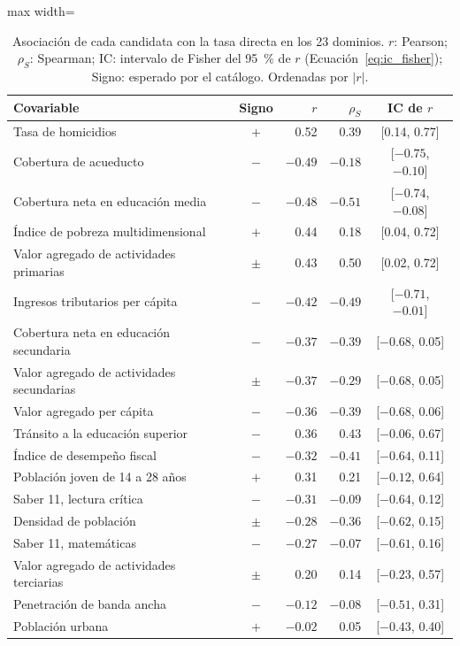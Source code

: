 \begin{table}[!htbp]
\centering
\small
\caption{Asociación de cada candidata con la tasa directa en los 23 dominios. $r$: Pearson; $\rho_S$: Spearman; IC: intervalo de Fisher del 95~\% de $r$ (Ecuación~\ref{eq:ic_fisher}); Signo: esperado por el catálogo. Ordenadas por $|r|$.}
\label{tab:res_bivariado}
\begin{adjustbox}{max width=\linewidth}
\begin{tabular}{l c r r c}
\toprule
Covariable & Signo & $r$ & $\rho_S$ & IC de $r$ \\
\midrule
Tasa de homicidios & $+$ & 0.52 & 0.39 & [0.14, 0.77] \\
Cobertura de acueducto & $-$ & $-0.49$ & $-0.18$ & [$-0.75$, $-0.10$] \\
Cobertura neta en educación media & $-$ & $-0.48$ & $-0.51$ & [$-0.74$, $-0.08$] \\
Índice de pobreza multidimensional & $+$ & 0.44 & 0.18 & [0.04, 0.72] \\
Valor agregado de actividades primarias & $\pm$ & 0.43 & 0.50 & [0.02, 0.72] \\
Ingresos tributarios per cápita & $-$ & $-0.42$ & $-0.49$ & [$-0.71$, $-0.01$] \\
Cobertura neta en educación secundaria & $-$ & $-0.37$ & $-0.39$ & [$-0.68$, 0.05] \\
Valor agregado de actividades secundarias & $\pm$ & $-0.37$ & $-0.29$ & [$-0.68$, 0.05] \\
Valor agregado per cápita & $-$ & $-0.36$ & $-0.39$ & [$-0.68$, 0.06] \\
Tránsito a la educación superior & $-$ & 0.36 & 0.43 & [$-0.06$, 0.67] \\
Índice de desempeño fiscal & $-$ & $-0.32$ & $-0.41$ & [$-0.64$, 0.11] \\
Población joven de 14 a 28 años & $+$ & 0.31 & 0.21 & [$-0.12$, 0.64] \\
Saber 11, lectura crítica & $-$ & $-0.31$ & $-0.09$ & [$-0.64$, 0.12] \\
Densidad de población & $\pm$ & $-0.28$ & $-0.36$ & [$-0.62$, 0.15] \\
Saber 11, matemáticas & $-$ & $-0.27$ & $-0.07$ & [$-0.61$, 0.16] \\
Valor agregado de actividades terciarias & $\pm$ & 0.20 & 0.14 & [$-0.23$, 0.57] \\
Penetración de banda ancha & $-$ & $-0.12$ & $-0.08$ & [$-0.51$, 0.31] \\
Población urbana & $+$ & $-0.02$ & 0.05 & [$-0.43$, 0.40] \\
\bottomrule
\end{tabular}
\end{adjustbox}
\end{table}

